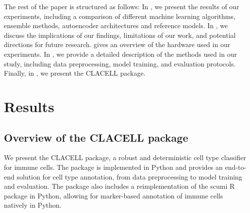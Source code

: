 \documentclass[11pt]{article}
\begin{document}
The rest of the paper is structured as follows: In , we present the results of our experiments, including a comparison of different machine learning algorithms, ensemble methods, autoencoder architectures and reference models. In , we discuss the implications of our findings, limitations of our work, and potential directions for future research.  gives an overview of the hardware used in our experiments. In , we provide a detailed description of the methods used in our study, including data preprocessing, model training, and evaluation protocols. Finally, in , we present the CLACELL package. %



\section{Results}\label{sec:results}

\subsection{Overview of the CLACELL package}\label{sec:results:overview}




We present the CLACELL package, a robust and deterministic cell type classifier for immune cells. The package is implemented in Python and provides an end-to-end solution for cell type annotation, from data preprocessing to model training and evaluation. The package also includes a reimplementation of the scumi R package in Python, allowing for marker-based annotation of immune cells natively in Python. %
\end{document}
